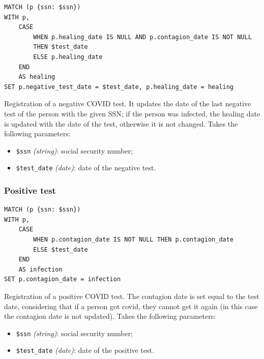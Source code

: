 \documentclass[12pt, a4paper]{article}
\begin{document}
\begin{tcolorbox}[fontupper=\scriptsize]
    \begin{verbatim}
MATCH (p {ssn: $ssn})
WITH p,
    CASE 
        WHEN p.healing_date IS NULL AND p.contagion_date IS NOT NULL 
        THEN $test_date
        ELSE p.healing_date
    END 
    AS healing
SET p.negative_test_date = $test_date, p.healing_date = healing
    \end{verbatim}
\end{tcolorbox}

\noindent %
Registration of a negative COVID test. It updates the date of the last negative
test of the person with the given SSN; if the person was infected, the healing 
date is updated with the date of the test, otherwise it is not changed.
Takes the following parameters: 
\begin{itemize}
    \item \texttt{\$ssn} \emph{(string)}: social security number;
    \item \texttt{\$test\_date} \emph{(date)}: date of the negative test.

\end{itemize}

\subsubsection{Positive test}
\begin{tcolorbox}[fontupper=\scriptsize]
    \begin{verbatim}
MATCH (p {ssn: $ssn})
WITH p,
    CASE 
        WHEN p.contagion_date IS NOT NULL THEN p.contagion_date
        ELSE $test_date
    END 
    AS infection
SET p.contagion_date = infection
    \end{verbatim}
\end{tcolorbox}

\noindent %
Registration of a positive COVID test. The contagion date is set equal to the 
test date, considering that if a person got covid, they cannot get it again 
(in this case the contagion date is not updated).
Takes the following parameters: 
\begin{itemize}
    \item \texttt{\$ssn} \emph{(string)}: social security number;
    \item \texttt{\$test\_date} \emph{(date)}: date of the positive test.
\end{itemize}

\clearpage
\end{document}
